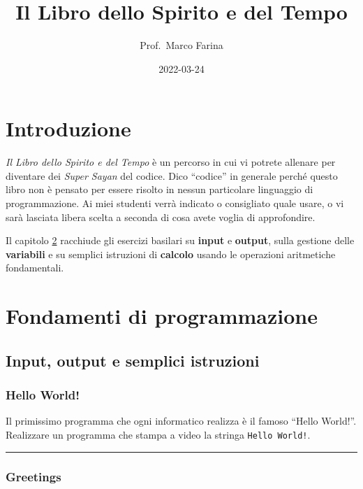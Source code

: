 \documentclass[
]{book}
\title{Il Libro dello Spirito e del Tempo}
\author{Prof.~Marco Farina}
\date{2022-03-24}
\begin{document}
\maketitle

{
\setcounter{tocdepth}{1}
\tableofcontents
}
\hypertarget{introduzione}{%
\chapter{Introduzione}\label{introduzione}}

\emph{Il Libro dello Spirito e del Tempo} è un percorso in cui vi potrete allenare per diventare dei \emph{Super Sayan} del codice. Dico ``codice'' in generale perché questo libro non è pensato per essere risolto in nessun particolare linguaggio di programmazione. Ai miei studenti verrà indicato o consigliato quale usare, o vi sarà lasciata libera scelta a seconda di cosa avete voglia di approfondire.

Il capitolo \ref{fondamenti} racchiude gli esercizi basilari su \textbf{input} e \textbf{output}, sulla gestione delle \textbf{variabili} e su semplici istruzioni di \textbf{calcolo} usando le operazioni aritmetiche fondamentali.

\hypertarget{fondamenti}{%
\chapter{Fondamenti di programmazione}\label{fondamenti}}

\hypertarget{input-output-e-semplici-istruzioni}{%
\section{Input, output e semplici istruzioni}\label{input-output-e-semplici-istruzioni}}

\hypertarget{hello-world}{%
\subsection{Hello World!}\label{hello-world}}

Il primissimo programma che ogni informatico realizza è il famoso ``Hello World!''. Realizzare un programma che stampa a video la stringa \texttt{Hello\ World!}.

\begin{center}\rule{0.5\linewidth}{0.5pt}\end{center}

\hypertarget{greetings}{%
\subsection{Greetings}\label{greetings}}
\end{document}
